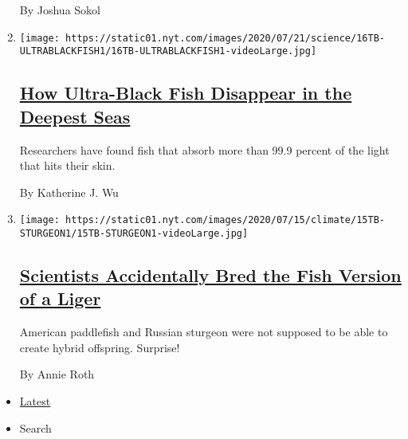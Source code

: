 \begin{enumerate}
  By Joshua Sokol
\item
  \texttt{[image: https://static01.nyt.com/images/2020/07/21/science/16TB-ULTRABLACKFISH1/16TB-ULTRABLACKFISH1-videoLarge.jpg]}

  \hypertarget{how-ultra-black-fish-disappear-in-the-deepest-seas}{%
  \subsection{\texorpdfstring{\href{/2020/07/16/science/ultra-black-fish.html}{How
  Ultra-Black Fish Disappear in the Deepest
  Seas}}{How Ultra-Black Fish Disappear in the Deepest Seas}}\label{how-ultra-black-fish-disappear-in-the-deepest-seas}}

  Researchers have found fish that absorb more than 99.9 percent of the
  light that hits their skin.

  By Katherine J. Wu
\item
  \texttt{[image: https://static01.nyt.com/images/2020/07/15/climate/15TB-STURGEON1/15TB-STURGEON1-videoLarge.jpg]}

  \hypertarget{scientists-accidentally-bred-the-fish-version-of-a-liger}{%
  \subsection{\texorpdfstring{\href{/2020/07/15/science/hybrid-sturgeon-paddlefish.html}{Scientists
  Accidentally Bred the Fish Version of a
  Liger}}{Scientists Accidentally Bred the Fish Version of a Liger}}\label{scientists-accidentally-bred-the-fish-version-of-a-liger}}

  American paddlefish and Russian sturgeon were not supposed to be able
  to create hybrid offspring. Surprise!

  By Annie Roth
\end{enumerate}

\begin{itemize}
\tightlist
\item
  \protect\hyperlink{stream-panel}{Latest}
\item
  Search
\end{itemize}

